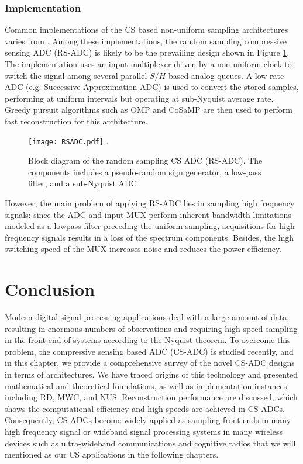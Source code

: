 \subsubsection{Implementation}

Common implementations of the CS based non-uniform sampling architectures varies from \cite{laska2006random, ragheb2007implementation, maechler2011random, rogers2011compressive}. Among these implementations, the random sampling compressive sensing ADC (RS-ADC) is likely to be the prevailing design shown in Figure \ref{RS-ADC}. The implementation uses an input multiplexer driven by a non-uniform clock to switch the signal among several parallel $S/H$ based analog queues. A low rate ADC (e.g. Successive Approximation ADC) is used to convert the stored samples, performing at uniform intervals but operating at sub-Nyquist average rate. Greedy pursuit algorithms such as OMP and CoSaMP are then used to perform fast reconstruction for this architecture.

\begin{figure}[!t]
\centering
\texttt{[image: RSADC.pdf]}
\DeclareGraphicsExtensions.
\caption{Block diagram of the random sampling CS ADC (RS-ADC). The components includes a pseudo-random sign generator, a low-pass filter, and a sub-Nyquist ADC}\label{RS-ADC}
\end{figure}

However, the main problem of applying RS-ADC lies in sampling high frequency signals: since the ADC and input MUX perform inherent bandwidth limitations modeled as a lowpass filter preceding the uniform sampling, acquisitions for high frequency signals results in a loss of the spectrum components. Besides, the high switching speed of the MUX increases noise and reduces the power efficiency.

\section{Conclusion}

Modern digital signal processing applications deal with a large amount of data, resulting in enormous numbers of observations and requiring high speed sampling in the front-end of systems according to the Nyquist theorem. To overcome this problem, the compressive sensing based ADC (CS-ADC) is studied recently, and in this chapter, we provide a comprehensive survey of the novel CS-ADC designs in terms of architectures. We have traced origins of this technology and presented mathematical and theoretical foundations, as well as implementation instances including RD, MWC, and NUS. Reconstruction performance are discussed, which shows the computational efficiency and high speeds are achieved in CS-ADCs. Consequently, CS-ADCs become widely applied as sampling front-ends in many high frequency signal or wideband signal processing systems in many wireless devices such as ultra-wideband communications and cognitive radios that we will mentioned as our CS applications in the following chapters.  

